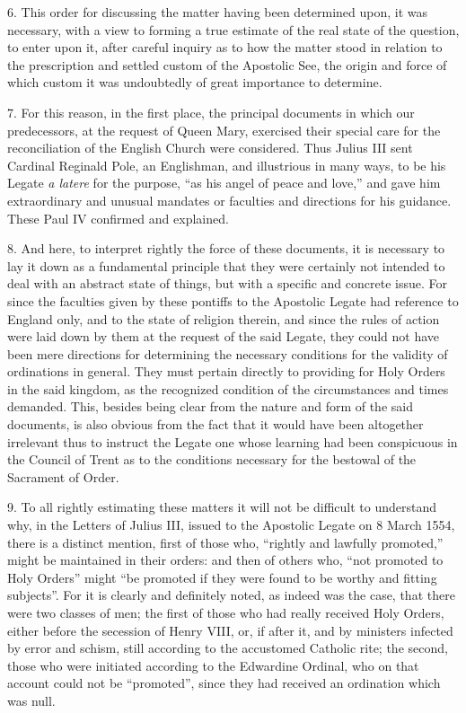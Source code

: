 6. This order for discussing the matter having been determined upon, it
was necessary, with a view to forming a true estimate of the real state
of the question, to enter upon it, after careful inquiry as to how the
matter stood in relation to the prescription and settled custom of the
Apostolic See, the origin and force of which custom it was undoubtedly
of great importance to determine.

7. For this reason, in the first place, the principal documents in which
our predecessors, at the request of Queen Mary, exercised their special
care for the reconciliation of the English Church were considered. Thus
Julius III sent Cardinal Reginald Pole, an Englishman, and illustrious
in many ways, to be his Legate \emph{a latere} for the purpose, ``as his
angel of peace and love,'' and gave him extraordinary and unusual
mandates or faculties and directions for his guidance. These Paul IV
confirmed and explained.

8. And here, to interpret rightly the force of these documents, it is
necessary to lay it down as a fundamental principle that they were
certainly not intended to deal with an abstract state of things, but
with a specific and concrete issue. For since the faculties given by
these pontiffs to the Apostolic Legate had reference to England only,
and to the state of religion therein, and since the rules of action were
laid down by them at the request of the said Legate, they could not have
been mere directions for determining the necessary conditions for the
validity of ordinations in general. They must pertain directly to
providing for Holy Orders in the said kingdom, as the recognized
condition of the circumstances and times demanded. This, besides being
clear from the nature and form of the said documents, is also obvious
from the fact that it would have been altogether irrelevant thus to
instruct the Legate one whose learning had been conspicuous in the
Council of Trent as to the conditions necessary for the bestowal of the
Sacrament of Order.

9. To all rightly estimating these matters it will not be difficult to
understand why, in the Letters of Julius III, issued to the Apostolic
Legate on 8 March 1554, there is a distinct mention, first of those who,
``rightly and lawfully promoted,'' might be maintained in their orders:
and then of others who, ``not promoted to Holy Orders'' might ``be
promoted if they were found to be worthy and fitting subjects''. For it
is clearly and definitely noted, as indeed was the case, that there were
two classes of men; the first of those who had really received Holy
Orders, either before the secession of Henry VIII, or, if after it, and
by ministers infected by error and schism, still according to the
accustomed Catholic rite; the second, those who were initiated according
to the Edwardine Ordinal, who on that account could not be ``promoted'',
since they had received an ordination which was null.

